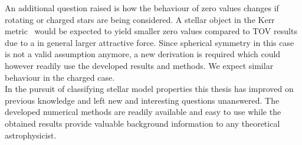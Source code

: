 An additional question raised is how the behaviour of zero values changes if rotating or charged stars are being considered.
A stellar object in the Kerr metric~\cite{kerrGravitationalFieldSpinning1963} would be expected to yield smaller zero values compared to \ac{TOV} results due to a in general larger attractive force.
Since spherical symmetry in this case is not a valid assumption anymore, a new derivation is required which could however readily use the developed results and methods.
We expect similar behaviour in the charged case.\\
In the pursuit of classifying stellar model properties this thesis has improved on previous knowledge and left new and interesting questions unanswered.
The developed numerical methods are readily available and easy to use while the obtained results provide valuable background information to any theoretical astrophysicist.